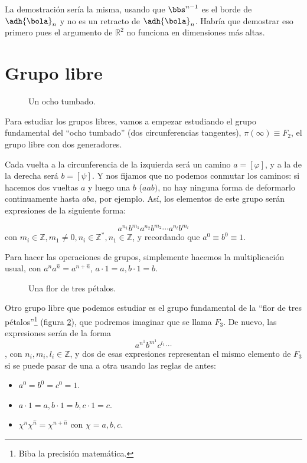 \documentclass{apuntes}
\begin{document}
La demostración sería la misma, usando que $\bbs^{n-1}$ es el borde de $\adh{\bola}_n$ y no es un retracto de $\adh{\bola}_n$. Habría que demostrar eso primero pues el argumento de $ℝ^2$ no funciona en dimensiones más altas.

\section{Grupo libre}

\begin{figure}
\centering
{}
\caption{Un ocho tumbado.}
\label{figOchoTumbado}
\end{figure}

Para estudiar los grupos libres, vamos a empezar estudiando el grupo fundamental del ``ocho tumbado'' (dos circunferencias tangentes), $π(∞) \equiv F_2$, el grupo libre con dos generadores.

Cada vuelta a la circunferencia de la izquierda será un camino $a = [φ]$, y a la de la derecha será $b = [ψ]$. Y nos fijamos que no podemos conmutar los caminos: si hacemos dos vueltas $a$ y luego una $b$ ($aab)$, no hay ninguna forma de deformarlo continuamente hasta $aba$, por ejemplo. Así, los elementos de este grupo serán expresiones de la siguiente forma:

\[ a^{n_1}b^{m_1} a^{n_2} b^{m_2} \dotsb a^{n_l} b^{m_l} \] con $m_i ∈ ℤ, m_1 ≠ 0, n_i ∈ ℤ^*, n_1 ∈ ℤ$, y recordando que $a^0 \equiv b^0 \equiv 1$.

Para hacer las operaciones de grupos, simplemente hacemos la multiplicación usual, con $a^na^{\hat{n}} = a^{n+\hat{n}}$, $a·1 = a, b·1 = b$.

\begin{figure}[hbtp]
\centering
{}
\caption{Una flor de tres pétalos.}
\label{figFlor}
\end{figure}

Otro grupo libre que podemos estudiar es el grupo fundamental de la ``flor de tres pétalos''\footnote{Biba la precisión matemática.} (figura \ref{figFlor}), que podremos imaginar que se llama $F_3$. De nuevo, las expresiones serán de la forma \[ a^{n^1}b^{m^1}c^{l_1} \dotsb \], con $n_i, m_i, l_i ∈ ℤ$, y dos de esas expresiones representan el mismo elemento de $F_3$ si se puede pasar de una a otra usando las reglas de antes:

\begin{itemize}
	\item $a^0 = b^0 = c^0 = 1$.
	\item $a · 1 = a,  b · 1 = b, c · 1 = c$.
	\item $χ^nχ^{\hat{n}} = χ^{n+\hat{n}}$ con $χ = a,b,c$.
\end{itemize}
\end{document}

